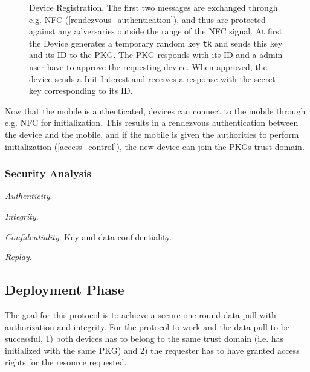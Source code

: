\begin{figure}[H]
  \caption{Device Registration. 
  The first two messages are exchanged through e.g. NFC (\autoref{rendezvous_authentication}), and thus are protected against any adversaries outside the range of the NFC signal. 
  At first the Device generates a temporary random key \texttt{tk} and sends this key and its ID to the PKG. 
  The PKG responds with its ID and a admin user have to approve the requesting device.
  When approved, the device sends a Init Interest and receives a response with the secret key corresponding to its ID.
  }
  \label{fig:init_ibe_1}
\end{figure}



Now that the mobile is authenticated, devices can connect to the mobile through e.g. \gls{NFC} for initialization.
This results in a rendezvous authentication between the device and the mobile, and if the mobile is given the authorities to perform initialization (\autoref{access_control}), the new device can join the \gls{PKG}s trust domain.

\subsubsection{Security Analysis}

\textit{Authenticity}.

\textit{Integrity}.

\textit{Confidentiality}. Key and data confidentiality.

\textit{Replay}.

\subsection{Deployment Phase}\label{data_pull}
The goal for this protocol is to achieve a secure one-round \gls{data} pull with authorization and integrity.
For the protocol to work and the \gls{data} pull to be successful, 1) both devices has to belong to the same trust domain (i.e. has initialized with the same \gls{PKG}) and 2) the requester has to have granted access rights for the resource requested.


